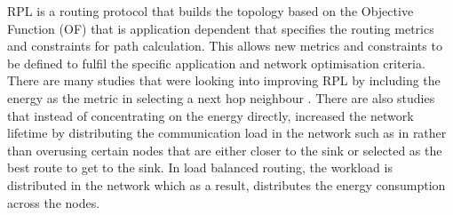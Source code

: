 


RPL is a routing protocol that builds the topology based on the Objective Function (OF) that is application dependent that specifies the routing metrics and constraints for path calculation.
This allows new metrics and constraints to be defined to fulfil the specific application and network optimisation criteria. 
There are many studies that were looking into improving RPL by including the energy as the metric in selecting a next hop neighbour \cite{energyrpl, energyLHC, elt, customOF, roee, compositeMetric, caof}.
There are also studies that instead of concentrating on the energy directly, increased the network lifetime by distributing the communication load in the network such as in \cite{loadbalance, spreadload} rather than overusing certain nodes that are either closer to the sink or selected as the best route to get to the sink.
In load balanced routing, the workload is distributed in the network which as a result, distributes the energy consumption across the nodes. 

